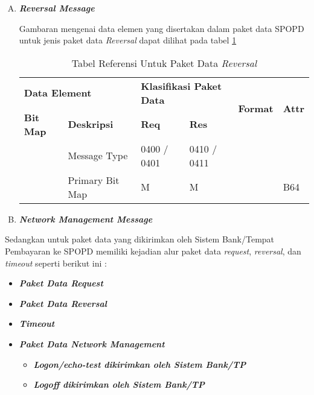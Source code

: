 \begin{enumerate}[A.]
  \item \textbf{\textit{Reversal Message}}
  
  Gambaran mengenai data elemen yang disertakan dalam paket data SPOPD untuk jenis paket data \textit{Reversal} dapat dilihat pada tabel \ref{tab:reversal}
  
  \begin{table}[H]
    \centering
    \scriptsize
    \begin{tabular}{|p{3em}|p{10em}|p{3em}|p{3em}|l|l|}
    \hline
    \multicolumn{2}{|p{13em}|}{\textbf{Data Element}} & \multicolumn{2}{|p{6em}|}{\textbf{Klasifikasi Paket Data}} & \multirow{2}{*}{\textbf{Format}} & \multirow{2}{*}{\textbf{Attr}} \\
    \cline{1-4}
    \textbf{Bit Map} & \textbf{Deskripsi} & \textbf{Req} & \textbf{Res} & & \\
    \hline
    \hline
    & Message Type & 0400 / 0401 & 0410 / 0411 & & \\
    \hline
    & Primary Bit Map & M & M & & B64 \\
    \hline
    \end{tabular}
    \caption{Tabel Referensi Untuk Paket Data \textit{Reversal}}
    \label{tab:reversal}
  \end{table}
  
  \item \textbf{\textit{Network Management Message}}

\end{enumerate}

Sedangkan untuk paket data yang dikirimkan oleh Sistem Bank/Tempat Pembayaran ke SPOPD memiliki kejadian alur paket data \textit{request}, \textit{reversal}, dan \textit{timeout} seperti berikut ini :

\begin{itemize}

  \item \textbf{\textit{Paket Data Request}}
  
  \item \textbf{\textit{Paket Data Reversal}}
  
  \item \textbf{\textit{Timeout}}
  
  \item \textbf{\textit{Paket Data Network Management}}
  
  \begin{itemize}
    \item \textbf{\textit{Logon/echo-test dikirimkan oleh Sistem Bank/TP}}
    \item \textbf{\textit{Logoff dikirimkan oleh Sistem Bank/TP}}
  \end{itemize}

\end{itemize}